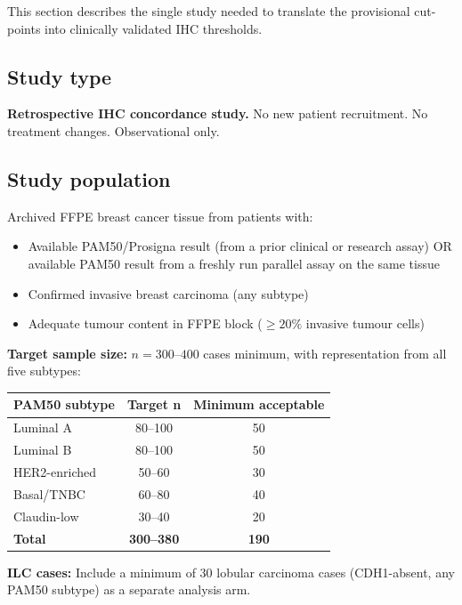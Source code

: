 \documentclass[11pt, a4paper]{article}
\begin{document}
This section describes the single study needed
to translate the provisional cut-points into
clinically validated IHC thresholds.

\subsection{Study type}

\textbf{Retrospective IHC concordance study.}
No new patient recruitment. No treatment
changes. Observational only.

\subsection{Study population}

Archived FFPE breast cancer tissue from patients
with:
\begin{itemize}[noitemsep]
    \item Available PAM50/Prosigna result
    (from a prior clinical or research assay)
    OR available PAM50 result from a freshly
    run parallel assay on the same tissue
    \item Confirmed invasive breast carcinoma
    (any subtype)
    \item Adequate tumour content in FFPE
    block ($\geq 20\%$ invasive tumour cells)
\end{itemize}

\textbf{Target sample size:}
$n = 300$--$400$ cases minimum, with
representation from all five subtypes:

\begin{center}
\begin{tabular}{lcc}
\toprule
\textbf{PAM50 subtype} &
\textbf{Target n} &
\textbf{Minimum acceptable} \\
\midrule
Luminal A & 80--100 & 50 \\
Luminal B & 80--100 & 50 \\
HER2-enriched & 50--60 & 30 \\
Basal/TNBC & 60--80 & 40 \\
Claudin-low & 30--40 & 20 \\
\textbf{Total} & \textbf{300--380} & \textbf{190} \\
\bottomrule
\end{tabular}
\end{center}

\textbf{ILC cases:} Include a minimum of
30 lobular carcinoma cases (CDH1-absent, any
PAM50 subtype) as a separate analysis arm.
\end{document}
